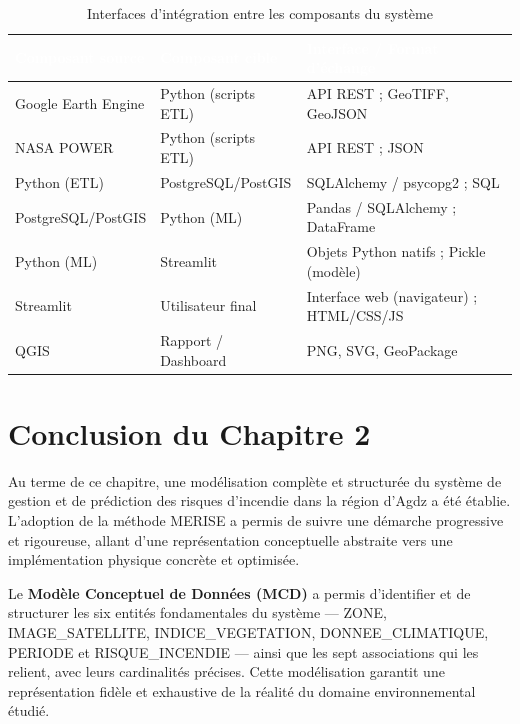 \documentclass[12pt,a4paper]{report}
\begin{document}
\begin{table}[H]
\centering
{}
\begin{tabularx}{\textwidth}{L{3cm} L{3.5cm} X}
\toprule
{}
\textcolor{white}{\textbf{Composant source}} &
\textcolor{white}{\textbf{Composant cible}} &
\textcolor{white}{\textbf{Interface / Format d'échange}} \\
\midrule
Google Earth Engine & Python (scripts ETL) & API REST ; GeoTIFF, GeoJSON \\
NASA POWER          & Python (scripts ETL) & API REST ; JSON \\
Python (ETL)        & PostgreSQL/PostGIS   & SQLAlchemy / psycopg2 ; SQL \\
PostgreSQL/PostGIS  & Python (ML)          & Pandas / SQLAlchemy ; DataFrame \\
Python (ML)         & Streamlit            & Objets Python natifs ; Pickle (modèle) \\
Streamlit           & Utilisateur final    & Interface web (navigateur) ; HTML/CSS/JS \\
QGIS                & Rapport / Dashboard  & PNG, SVG, GeoPackage \\
\bottomrule
\end{tabularx}
\caption{Interfaces d'intégration entre les composants du système}
\label{tab:integration}
\end{table}

\clearpage
\chapter*{Conclusion du Chapitre 2}

Au terme de ce chapitre, une modélisation complète et structurée du système de gestion et de prédiction des risques d'incendie dans la région d'Agdz a été établie. L'adoption de la méthode MERISE a permis de suivre une démarche progressive et rigoureuse, allant d'une représentation conceptuelle abstraite vers une implémentation physique concrète et optimisée.

Le \textbf{Modèle Conceptuel de Données (MCD)} a permis d'identifier et de structurer les six entités fondamentales du système --- ZONE, IMAGE\_SATELLITE, INDICE\_VEGETATION, DONNEE\_CLIMATIQUE, PERIODE et RISQUE\_INCENDIE --- ainsi que les sept associations qui les relient, avec leurs cardinalités précises. Cette modélisation garantit une représentation fidèle et exhaustive de la réalité du domaine environnemental étudié.
\end{document}
